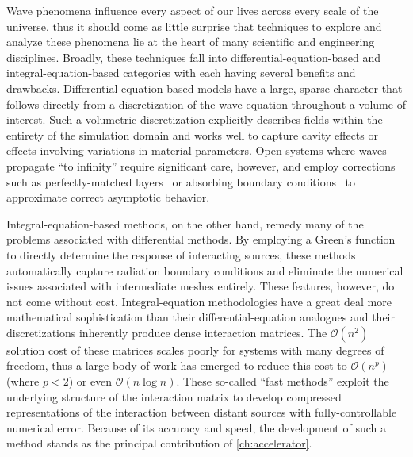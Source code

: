 Wave phenomena influence every aspect of our lives across every scale of the universe, thus it should come as little surprise that techniques to explore and analyze these phenomena lie at the heart of many scientific and engineering disciplines.
Broadly, these techniques fall into differential-equation-based and integral-equation-based categories with each having several benefits and drawbacks.
Differential-equation-based models have a large, sparse character that follows directly from a discretization of the wave equation throughout a volume of interest.
Such a volumetric discretization explicitly describes fields within the entirety of the simulation domain and works well to capture cavity effects or effects involving variations in material parameters.
Open systems where waves propagate ``to infinity'' require significant care, however, and employ corrections such as perfectly-matched layers~\cite{Berenger1994} or absorbing boundary conditions~\cite{Mur1981} to approximate correct asymptotic behavior.

Integral-equation-based methods, on the other hand, remedy many of the problems associated with differential methods.
By employing a Green's function to directly determine the response of interacting sources, these methods automatically capture radiation boundary conditions and eliminate the numerical issues associated with intermediate meshes entirely.
These features, however, do not come without cost.
Integral-equation methodologies have a great deal more mathematical sophistication than their differential-equation analogues and their discretizations inherently produce dense interaction matrices.
The $\mathcal{O}(n^2)$ solution cost of these matrices scales poorly for systems with many degrees of freedom, thus a large body of work has emerged to reduce this cost to $\mathcal{O}(n^p)$ (where $p < 2$) or even $\mathcal{O}(n \log n)$.
These so-called ``fast methods'' exploit the underlying structure of the interaction matrix to develop compressed representations of the interaction between distant sources with fully-controllable numerical error.
Because of its accuracy and speed, the development of such a method stands as the principal contribution of \cref{ch:accelerator}.
